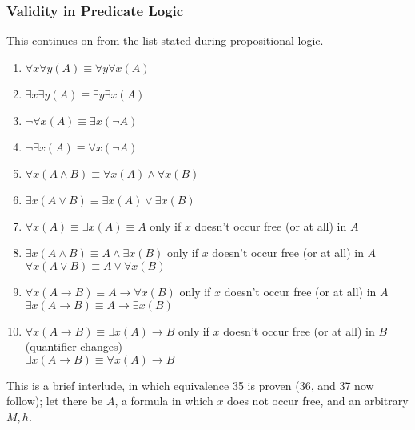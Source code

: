 \documentclass[a4paper, 12pt]{article}
\begin{document}
            \subsubsection*{Validity in Predicate Logic}
                This continues on from the list stated during propositional logic.
                \begin{enumerate}[1.]
                    \itemsep0em
                    \setcounter{enumi}{27}
                    \item $\forall x \forall y (A) \equiv \forall y \forall x (A)$
                    \item $\exists x \exists y (A) \equiv \exists y \exists x (A)$
                    \item $\neg \forall x (A) \equiv \exists x (\neg A)$
                    \item $\neg \exists x (A) \equiv \forall x (\neg A)$
                    \item $\forall x (A \land B) \equiv \forall x (A) \land \forall x (B)$
                    \item $\exists x (A \lor B) \equiv \exists x (A) \lor \exists x (B)$
                    \item $\forall x (A) \equiv \exists x (A) \equiv A$ \hfill only if $x$ doesn't occur free (or at all) in $A$
                    \item $\exists x (A \land B) \equiv A \land \exists x (B)$ \hfill only if $x$ doesn't occur free (or at all) in $A$ \\ $\forall x (A \lor B) \equiv A \lor \forall x (B)$
                    \item $\forall x (A \rightarrow B) \equiv A \rightarrow \forall x (B)$ \hfill only if $x$ doesn't occur free (or at all) in $A$ \\ $\exists x (A \rightarrow B) \equiv A \rightarrow \exists x (B)$
                    \item $\forall x (A \rightarrow B) \equiv \exists x (A) \rightarrow B$ \hfill only if $x$ doesn't occur free (or at all) in $B$ (quantifier changes) \\ $\exists x (A \rightarrow B) \equiv \forall x (A) \rightarrow B$
                \end{enumerate}
                This is a brief interlude, in which equivalence 35 is proven (36, and 37 now follow); let there be $A$, a formula in which $x$ does not occur free, and an arbitrary $M, h$.
\end{document}
